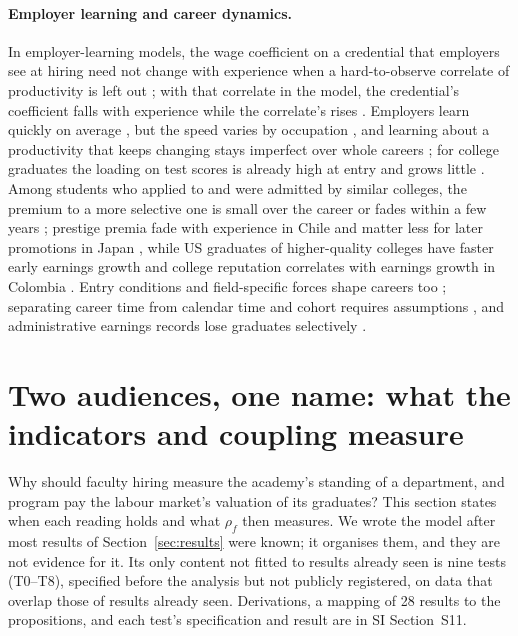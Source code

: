 \documentclass[11pt]{article}
\newcommand{\SI}[1]{SI Section~S#1}
\newcommand{\SItheory}{\SI{11}}
\begin{document}
\paragraph{Employer learning and career dynamics.} In employer-learning models, the wage coefficient on a
credential that employers see at hiring need not change with experience when a hard-to-observe correlate of
productivity is left out \citep{farber1996learning}; with that correlate in the model, the credential's coefficient
falls with experience while the correlate's rises \citep{altonji2001employer}. Employers learn quickly on average
\citep{lange2007speed}, but the speed varies by occupation \citep{mansour2012does}, and learning about a
productivity that keeps changing stays imperfect over whole careers \citep{kahn2014employer}; for college
graduates the loading on test scores is already high at entry and grows little \citep{arcidiacono2010beyond}. Among
students who applied to and were admitted by similar colleges, the premium to a more selective one is small over
the career \citep{dale2014estimating} or fades within a few years \citep{mountjoy2021returns}; prestige premia fade
with experience in Chile \citep{bordon2020employer} and matter less for later promotions in Japan
\citep{araki2016university}, while US graduates of higher-quality colleges have faster early earnings growth
\citep{thomas2005postbaccalaureate} and college reputation correlates with earnings growth in Colombia
\citep{macleod2017big}. Entry conditions and field-specific forces shape careers too \citep{oreopoulos2012short,
roksa2010what, altonji2016cashier, deming2020earnings}; separating career time from calendar time and cohort
requires assumptions \citep{fosse2019analyzing, fosse2019bounding}, and administrative earnings records lose
graduates selectively \citep{foote2026attrition}.

\section{Two audiences, one name: what the indicators and coupling measure}\label{sec:theory}

Why should faculty hiring measure the academy's standing of a department, and program pay the labour market's
valuation of its graduates? This section states when each reading holds and what $\rho_f$ then measures. We wrote
the model after most results of Section~\ref{sec:results} were known; it organises them, and they are not evidence
for it. Its only content not fitted to results already seen is nine tests (T0--T8), specified before the
analysis but not publicly registered, on data that overlap those of results already seen. Derivations, a mapping of 28 results to the
propositions, and each test's specification and result are in \SItheory.
\end{document}
